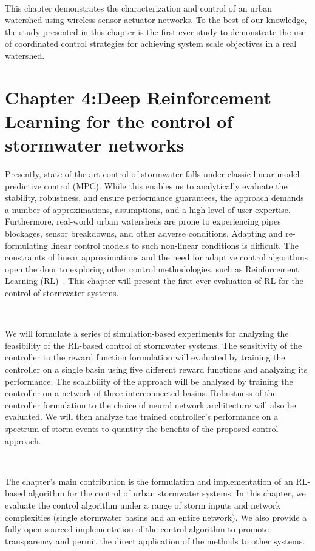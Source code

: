 \

This chapter demonstrates the characterization and control of an urban watershed using wireless sensor-actuator networks. To the best of our knowledge, the study presented in this chapter is the first-ever study to demonstrate the use of coordinated control strategies for achieving system scale objectives in a real watershed.

\section{Chapter 4:Deep Reinforcement Learning for the control of stormwater networks}

Presently, state-of-the-art control of stormwater falls under classic linear model predictive control (MPC).
While this enables us to analytically evaluate the stability, robustness, and ensure performance guarantees, the approach demands a number of approximations, assumptions, and a high level of user expertise.
Furthermore, real-world urban watersheds are prone to experiencing pipes blockages, sensor breakdowns, and other adverse conditions.
Adapting and re-formulating linear control models to such non-linear conditions is difficult.
The constraints of linear approximations and the need for adaptive control algorithms open the door to exploring other control methodologies, such as Reinforcement Learning (RL)~\cite{Mnih2015}.
This chapter will present the first ever evaluation of RL for the control of stormwater systems.

\

We will formulate a series of simulation-based experiments for analyzing the feasibility of the RL-based control of stormwater systems.
The sensitivity of the controller to the reward function formulation will evaluated by training the controller on a single basin using five different reward functions and analyzing its performance.
The scalability of the approach will be analyzed by training the controller on a network of three interconnected basins.
Robustness of the controller formulation to the choice of neural network architecture will also be evaluated.
We will then analyze the trained controller's performance on a spectrum of storm events to quantity the benefits of the proposed control approach.

\

The chapter's main contribution is the formulation and implementation of an RL-based algorithm for the control of urban stormwater systems. In this chapter, we evaluate the control algorithm under a range of storm inputs and network complexities (single stormwater basins and an entire network). 
We also provide a fully open-sourced implementation of the control algorithm to promote transparency and permit the direct application of the methods to other systems.


